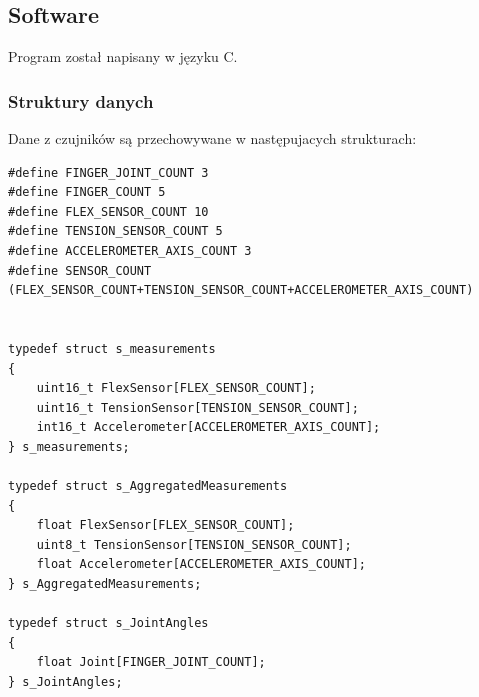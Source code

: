 \documentclass[12pt,a4paper]{article}
\begin{document}
\subsection{Software}
Program został napisany w języku C.
\subsubsection{Struktury danych}
Dane z czujników są przechowywane w następujacych strukturach:
\begin{lstlisting}[frame=single]
#define FINGER_JOINT_COUNT 3
#define FINGER_COUNT 5
#define FLEX_SENSOR_COUNT 10
#define TENSION_SENSOR_COUNT 5
#define ACCELEROMETER_AXIS_COUNT 3
#define SENSOR_COUNT (FLEX_SENSOR_COUNT+TENSION_SENSOR_COUNT+ACCELEROMETER_AXIS_COUNT)


typedef struct s_measurements
{
	uint16_t FlexSensor[FLEX_SENSOR_COUNT];
	uint16_t TensionSensor[TENSION_SENSOR_COUNT];
	int16_t Accelerometer[ACCELEROMETER_AXIS_COUNT];
} s_measurements;

typedef struct s_AggregatedMeasurements
{
	float FlexSensor[FLEX_SENSOR_COUNT];
	uint8_t TensionSensor[TENSION_SENSOR_COUNT];
	float Accelerometer[ACCELEROMETER_AXIS_COUNT];
} s_AggregatedMeasurements;

typedef struct s_JointAngles
{
	float Joint[FINGER_JOINT_COUNT];
} s_JointAngles;
\end{lstlisting}
\end{document}
